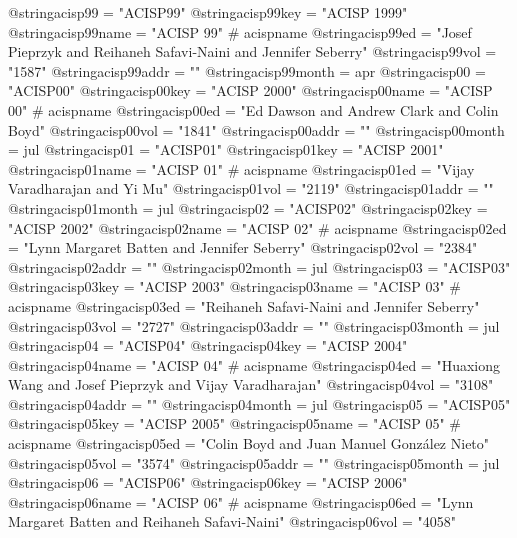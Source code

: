 @string{acisp99 =               "ACISP99"}
@string{acisp99key =            "ACISP 1999"}
@string{acisp99name =           "ACISP 99" # acispname}
@string{acisp99ed =             "Josef Pieprzyk and Reihaneh Safavi-Naini and Jennifer Seberry"}
@string{acisp99vol =            "1587"}
@string{acisp99addr =           ""}
@string{acisp99month =          apr}
@string{acisp00 =               "ACISP00"}
@string{acisp00key =            "ACISP 2000"}
@string{acisp00name =           "ACISP 00" # acispname}
@string{acisp00ed =             "Ed Dawson and Andrew Clark and Colin Boyd"}
@string{acisp00vol =            "1841"}
@string{acisp00addr =           ""}
@string{acisp00month =          jul}
@string{acisp01 =               "ACISP01"}
@string{acisp01key =            "ACISP 2001"}
@string{acisp01name =           "ACISP 01" # acispname}
@string{acisp01ed =             "Vijay Varadharajan and Yi Mu"}
@string{acisp01vol =            "2119"}
@string{acisp01addr =           ""}
@string{acisp01month =          jul}
@string{acisp02 =               "ACISP02"}
@string{acisp02key =            "ACISP 2002"}
@string{acisp02name =           "ACISP 02" # acispname}
@string{acisp02ed =             "Lynn Margaret Batten and Jennifer Seberry"}
@string{acisp02vol =            "2384"}
@string{acisp02addr =           ""}
@string{acisp02month =          jul}
@string{acisp03 =               "ACISP03"}
@string{acisp03key =            "ACISP 2003"}
@string{acisp03name =           "ACISP 03" # acispname}
@string{acisp03ed =             "Reihaneh Safavi-Naini and Jennifer Seberry"}
@string{acisp03vol =            "2727"}
@string{acisp03addr =           ""}
@string{acisp03month =          jul}
@string{acisp04 =               "ACISP04"}
@string{acisp04key =            "ACISP 2004"}
@string{acisp04name =           "ACISP 04" # acispname}
@string{acisp04ed =             "Huaxiong Wang and Josef Pieprzyk and Vijay Varadharajan"}
@string{acisp04vol =            "3108"}
@string{acisp04addr =           ""}
@string{acisp04month =          jul}
@string{acisp05 =               "ACISP05"}
@string{acisp05key =            "ACISP 2005"}
@string{acisp05name =           "ACISP 05" # acispname}
@string{acisp05ed =             "Colin Boyd and Juan Manuel Gonz{\'a}lez Nieto"}
@string{acisp05vol =            "3574"}
@string{acisp05addr =           ""}
@string{acisp05month =          jul}
@string{acisp06 =               "ACISP06"}
@string{acisp06key =            "ACISP 2006"}
@string{acisp06name =           "ACISP 06" # acispname}
@string{acisp06ed =             "Lynn Margaret Batten and Reihaneh Safavi-Naini"}
@string{acisp06vol =            "4058"}
